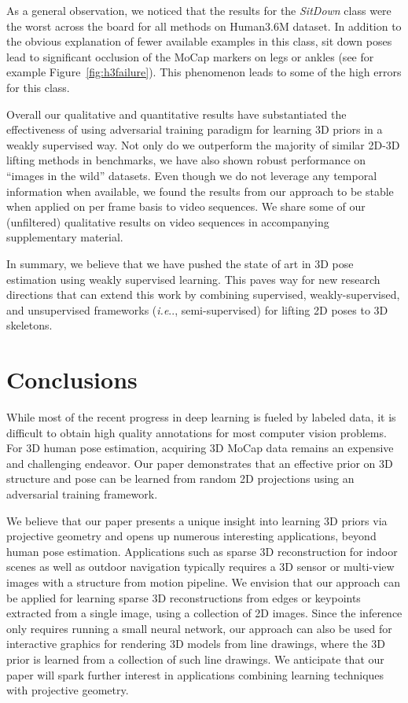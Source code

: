 \documentclass[runningheads]{llncs}
\makeatletter
\DeclareRobustCommand\onedot{\futurelet\@let@token\@onedot}
\def\@onedot{\ifx\@let@token.\else.\null\fi\xspace}
\def\ie{\emph{i.e}\onedot} \def\Ie{\emph{I.e}\onedot}
\makeatother
\begin{document}
As a general observation, we noticed that the results for the \textit{SitDown} class were the worst across the board for all methods on Human3.6M dataset. In addition to the obvious explanation of fewer available examples in this class, sit down poses lead to significant occlusion of the MoCap markers on legs or ankles (see for example Figure~\ref{fig:h3failure}).
This phenomenon leads to some of the high errors for this class.

Overall our qualitative and quantitative results have substantiated the effectiveness of using adversarial training paradigm for learning 3D priors in a weakly supervised way. Not only do we outperform the majority of similar 2D-3D lifting methods in benchmarks, we have also shown robust performance on ``images in the wild'' datasets. Even though we do not leverage any temporal information when available, we found the results from our approach to be stable when applied on per frame basis to video sequences. We share some of our (unfiltered) qualitative results on video sequences in accompanying supplementary material.

In summary, we believe that we have pushed the state of art in 3D pose estimation using weakly supervised learning. This paves way for new research directions that can extend this work by combining supervised, weakly-supervised, and unsupervised frameworks (\ie, semi-supervised) for lifting 2D poses to 3D skeletons.


\section{Conclusions}\label{sect:conclusions}

While most of the recent progress in deep learning is fueled by labeled data, it is difficult to obtain high quality annotations for most computer vision problems. For 3D human pose estimation, acquiring 3D MoCap data remains an expensive and challenging endeavor. Our paper demonstrates that an effective prior on 3D structure {and pose} can be learned from random 2D projections {using an adversarial training framework}. 

We believe that our paper presents a unique insight into learning 3D priors via projective geometry and opens up numerous interesting applications, beyond human pose estimation. Applications such as sparse 3D reconstruction for indoor scenes as well as outdoor navigation typically requires a 3D sensor or multi-view images with a structure from motion pipeline. We envision that our approach can be applied for learning sparse 3D reconstructions from edges or keypoints extracted from a single image, using a collection of 2D images. Since the inference only requires running a small neural network, our approach can also be used for interactive graphics for rendering 3D models from line drawings, where the 3D prior is learned from a collection of such line drawings. We anticipate that our paper will spark further interest in applications combining learning techniques with projective geometry.
\end{document}
